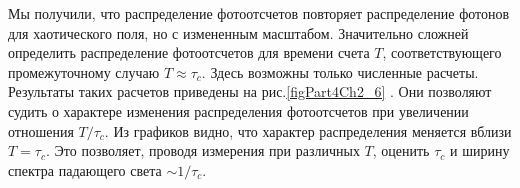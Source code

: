 Мы получили, что распределение фотоотсчетов повторяет распределение
фотонов для хаотического поля, но с измененным масштабом. Значительно
сложней определить распределение фотоотсчетов для времени счета $T$,
соответствующего промежуточному случаю $T \approx \tau_c$.  Здесь
возможны только численные расчеты. Результаты таких расчетов приведены
на рис.\ref{figPart4Ch2_6} \cite{bLoudon1976}. Они позволяют судить о характере
изменения распределения фотоотсчетов при увеличении отношения
$T/\tau_c$.  Из графиков видно, что характер распределения меняется
вблизи $T = \tau_c$.  Это позволяет, проводя измерения при различных
$T$,  оценить $\tau_c$ и ширину спектра падающего 
света $\sim 1/\tau_c$. 


